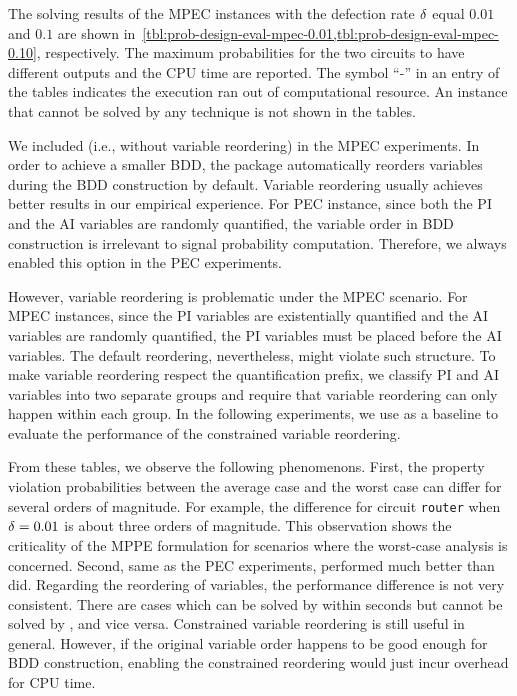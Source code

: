 The solving results of the MPEC instances with the defection rate $\delta$ equal $0.01$ and $0.1$
are shown in~\cref{tbl:prob-design-eval-mpec-0.01,tbl:prob-design-eval-mpec-0.10}, respectively.
The maximum probabilities for the two circuits to have different outputs and the CPU time are reported.
The symbol ``-'' in an entry of the tables indicates the execution ran out of computational resource.
An instance that cannot be solved by any technique is not shown in the tables.

We included \bddspnr (i.e., \bddsp without variable reordering) in the MPEC experiments.
In order to achieve a smaller BDD,
the \cudd package automatically reorders variables during the BDD construction by default.
Variable reordering usually achieves better results in our empirical experience.
For PEC instance, since both the PI and the AI variables are randomly quantified,
the variable order in BDD construction is irrelevant to signal probability computation.
Therefore, we always enabled this option in the PEC experiments.

However, variable reordering is problematic under the MPEC scenario.
For MPEC instances, since the PI variables are existentially quantified and the AI variables are randomly quantified,
the PI variables must be placed before the AI variables.
The default reordering, nevertheless, might violate such structure.
To make variable reordering respect the quantification prefix,
we classify PI and AI variables into two separate groups and
require that variable reordering can only happen within each group.
In the following experiments, we use \bddspnr as a baseline
to evaluate the performance of the constrained variable reordering.

From these tables, we observe the following phenomenons.
First, the property violation probabilities between the average case and the worst case
can differ for several orders of magnitude.
For example, the difference for circuit \texttt{router} when $\delta=0.01$ is about three orders of magnitude.
This observation shows the criticality of the MPPE formulation for scenarios
where the worst-case analysis is concerned.
Second, same as the PEC experiments, \bddsp performed much better than \dcssat did.
Regarding the reordering of variables,
the performance difference is not very consistent.
There are cases which can be solved by \bddsp within seconds but cannot be solved by \bddspnr, and vice versa.
Constrained variable reordering is still useful in general.
However, if the original variable order happens to be good enough for BDD construction,
enabling the constrained reordering would just incur overhead for CPU time.

